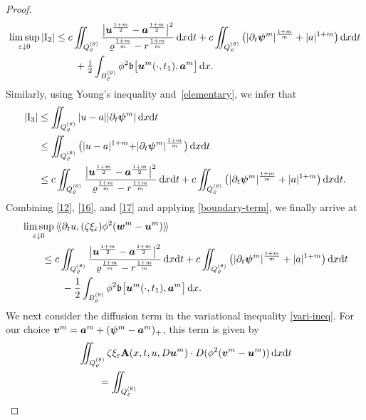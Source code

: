 \documentclass[a4paper, 10pt, american]{amsart}
\numberwithin{theorem}{section}
\numberwithin{equation}{section}
\newcommand{\A}[0]{\ensuremath{\mathbf{A}(x,t,u,D\power um)}}
\newcommand{\dxdt}{\,\mathrm{d}x\mathrm{d}t}
\newcommand{\dx}{\,\mathrm{d}x}
\renewcommand{\epsilon}{\varepsilon}
\renewcommand{\epsilon}{\varepsilon}
\newcommand{\eps}{\varepsilon}
\renewcommand{\rho}{\varrho}
\newcommand{\power}[2]{\bm{#1^{\mbox{\unboldmath{\scriptsize$#2$}}}}}
\begin{document}
\begin{proof}
\begin{align}\label{16}
\nonumber
	\limsup_{\epsilon\downarrow0}|\mathrm{I}_2|
	&\le 
	c\iint_{Q_\rho^{(\theta)}} 
	\frac{ \big|\power u {\frac{1+m}2} - \power a {\frac{1+m}2}\big|^2}{\rho^{\frac{1+m}{m}}-r^{\frac{1+m}{m}}} \dxdt 
	  +c\iint_{Q_\rho^{(\theta)}} \big( |\partial_{t} \power \psi m |^{\frac{1+m}m} +|a|^{1+m} \big) \dxdt\\
	&\quad\quad 
	+
	\tfrac12\int_{B_\rho^{(\theta)}} \phi^2 \mathfrak{b} \big[\power um (\cdot,t_1) , \power am\big] \dx.
\end{align}
Similarly, using Young's inequality and~\eqref{elementary}, we infer that
\begin{align}\label{17}
\nonumber
	|\mathrm{I}_3|
	&\le 
	\iint_{Q_\rho^{(\theta)}}  |u-a| |\partial_t \power \psi m|
        \dxdt \\\nonumber
        &\le
        \iint_{Q_\rho^{(\theta)}}\big( | u-a|^{1+m} {+} |\partial_{t} \power \psi m|^{\frac{1+m}m} \big)\dxdt\\
	&\le
	c\iint_{Q_\rho^{(\theta)}} 
	\frac{ \big|\power u {\frac{1+m}2} - \power a {\frac{1+m}2}\big|^2}{\rho^{\frac{1+m}{m}}-r^{\frac{1+m}{m}}} \dxdt 
	  +c\iint_{Q_\rho^{(\theta)}} \big( |\partial_{t} \power \psi m |^{\frac{1+m}m} +|a|^{1+m}\big)\dxdt .
\end{align}
Combining \eqref{12}, \eqref{16}, and \eqref{17} and applying
\eqref{boundary-term}, we finally arrive at
\begin{align}\label{est-time}
&  \limsup_{\eps\downarrow0}\,\langle\!\langle\partial_tu,(\zeta\xi_\varepsilon)\phi^2(\power
wm-\power um)\rangle\!\rangle \\\nonumber
&\qquad \le 
c\iint_{Q_\rho^{(\theta)}} 
\frac{ \big| \power u {\frac{1+m}2} - \power a {\frac{1+m}2}
  \big|^2}{\rho^{\frac{1+m}{m}}-r^{\frac{1+m}{m}}} \dxdt
+
c\iint_{Q_\rho^{(\theta)}}  \big(| \partial_{t} \power \psi m |^{\frac{1+m}m}+|a|^{1+m} \big)\dxdt\\\nonumber
&\qquad\qquad 
-
\frac12\int_{B_\rho^{(\theta)}} \phi^2 \mathfrak b \big[\power um (\cdot,t_1), \power am\big] \dx.
\end{align}
We next consider the diffusion term in the variational inequality
\eqref{vari-ineq}. For our choice $\power vm= \power
am+(\power\psi m-\power am)_+$, this term is given by 
\begin{align}\label{19}
& \iint_{Q_\rho^{(\theta)}}
\zeta\xi_\varepsilon \A \cdot D(\phi^2(\power vm-\power um)) \dxdt\\\nonumber
&\qquad =\iint_{Q_\rho^{(\theta)}}

\end{align}
\end{proof}
\end{document}
